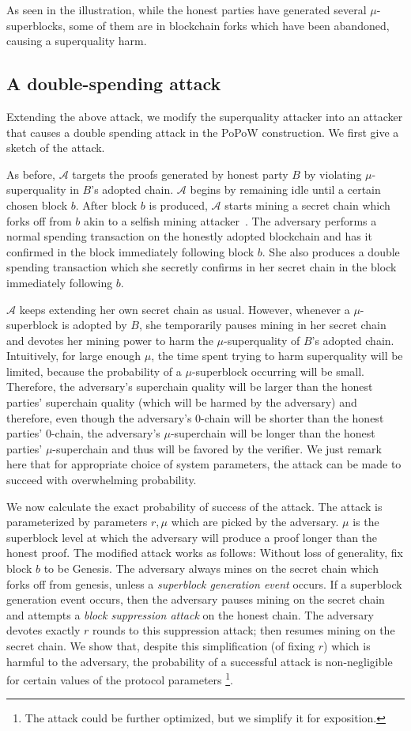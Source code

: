 As seen in the illustration, while the honest parties have generated several
$\mu$-superblocks, some of them are in blockchain forks which have been
abandoned, causing a superquality harm.

\subsection{A double-spending attack}
Extending the above attack, we modify the superquality attacker into an attacker
that causes a double spending attack in the PoPoW construction. We first give
a sketch of the attack.

As before, $\mathcal{A}$ targets the proofs generated by honest party $B$ by
violating $\mu$-superquality in $B$'s adopted chain. $\mathcal{A}$ begins by
remaining idle until a certain chosen block $b$. After block $b$ is produced,
$\mathcal{A}$ starts mining a secret chain which forks off from $b$ akin to a
selfish mining attacker~\cite{selfish}. The adversary performs a normal spending
transaction on the honestly adopted blockchain and has it confirmed in the block
immediately following block $b$. She also produces a double spending transaction
which she secretly confirms in her secret chain in the block immediately
following $b$.

$\mathcal{A}$ keeps extending her own secret chain as usual. However, whenever a
$\mu$-superblock is adopted by $B$, she temporarily pauses mining in her secret
chain and devotes her mining power to harm the $\mu$-superquality of $B$'s
adopted chain. Intuitively, for large enough $\mu$, the time spent trying to
harm superquality will be limited, because the probability of a $\mu$-superblock
occurring will be small. Therefore, the adversary's superchain quality will be
larger than the honest parties' superchain quality (which will be harmed by the
adversary) and therefore, even though the adversary's $0$-chain will be shorter
than the honest parties' $0$-chain, the adversary's $\mu$-superchain will be
longer than the honest parties' $\mu$-superchain and thus will be favored by the
verifier.
We just remark here that for appropriate choice of system parameters, the attack
can be made to succeed with overwhelming probability.

We now calculate the exact probability of success of the attack.
The attack is parameterized by  parameters $r, \mu$ which are picked by the
adversary. $\mu$ is the superblock level at which the adversary will produce a
proof longer than the honest proof. The modified attack works as follows:
Without loss of generality, fix block $b$ to be Genesis. The adversary always
mines on the secret chain which forks off from genesis, unless a
\emph{superblock generation event} occurs. If a superblock generation event
occurs, then the adversary pauses mining on the secret chain and attempts a
\emph{block suppression attack} on the honest chain. The adversary devotes
exactly $r$ rounds to this suppression attack; then resumes mining on the secret
chain. We show that, despite this simplification (of fixing $r$) which is
harmful to the adversary, the probability of a successful attack is
non-negligible for certain values of the protocol parameters
\footnote{The attack could be further optimized, but we simplify it for
exposition.}.

